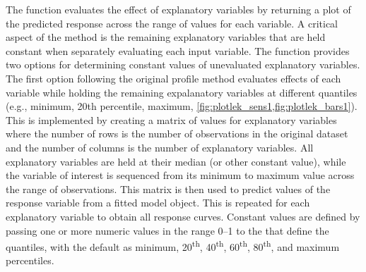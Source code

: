 \documentclass[article,shortnames]{jss}\usepackage[]{graphicx}\usepackage[]{color}
\begin{document}
The  function evaluates the effect of explanatory variables by returning a plot of the predicted response across the range of values for each variable.  A critical aspect of the method is the remaining explanatory variables that are held constant when separately evaluating each input variable.  The  function provides two options for determining constant values of unevaluated explanatory variables.  The first option following the original profile method evaluates effects of each variable while holding the remaining expalanatory variables at different quantiles (e.g., minimum, 20th percentile, maximum, \cref{fig:plotlek_sens1,fig:plotlek_bars1}). This is implemented by creating a matrix of values for explanatory variables where the number of rows is the number of observations in the original dataset and the number of columns is the number of explanatory variables. All explanatory variables are held at their median (or other constant value), while the variable of interest is sequenced from its minimum to maximum value across the range of observations. This matrix is then used to predict values of the response variable from a fitted model object. This is repeated for each explanatory variable to obtain all response curves.  Constant values are defined by passing one or more numeric values in the range 0--1 to the  that define the quantiles, with the default as minimum, 20\textsuperscript{th}, 40\textsuperscript{th}, 60\textsuperscript{th}, 80\textsuperscript{th}, and maximum percentiles.  
\end{document}

